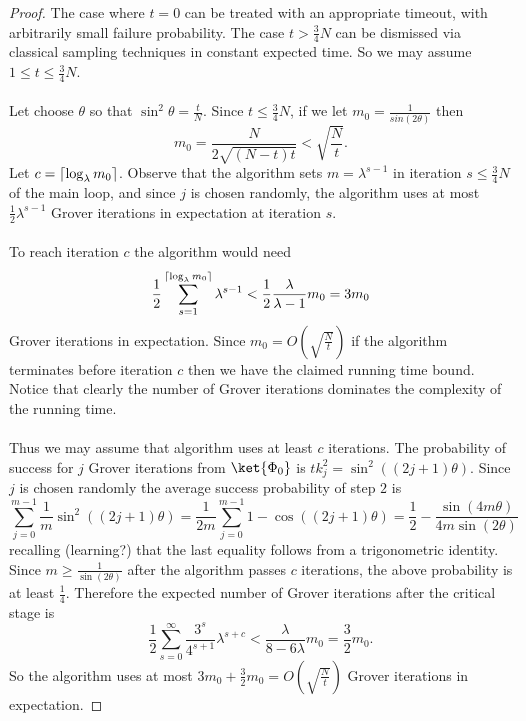 \begin{proof}
The case where $t=0$ can be treated with an appropriate timeout, with arbitrarily small failure probability. The case $t > \frac{3}{4}N$ can be dismissed via classical sampling techniques in constant expected time. So we may assume $1\leq t\leq \frac{3}{4}N$.
\paragraph{}
Let choose $\theta$ so that $\sin^2\theta = \frac{t}{N}$. Since $t\leq \frac{3}{4}N$, if we let $m_0 = \frac{1}{sin(2\theta)}$ then
$$m_0 = \frac{N}{2\sqrt{(N-t)t}} < \sqrt{\frac{N}{t}}.$$
Let $c = \left\lceil\log_\lambda m_0\right\rceil$. Observe that the algorithm sets $m =\lambda^{s-1}$ in iteration $s \leq \frac{3}{4}N$ of the main loop, and since $j$ is chosen randomly, the algorithm uses at most $\frac{1}{2} \lambda^{s-1}$ Grover iterations in expectation at iteration $s$. 
\paragraph{}
To reach iteration $c$ the algorithm would need
$$\frac{1}{2}\sum_{s=1}^{\left\lceil\log_\lambda m_0\right\rceil} \lambda^{s-1} <\frac{1}{2}\frac{\lambda}{\lambda - 1} m_0 = 3m_0$$
Grover iterations in expectation. Since $m_0 = O(\sqrt{\frac{N}{t}})$ if the algorithm terminates before iteration $c$ then we have the claimed running time bound. Notice that clearly the number of Grover iterations dominates the complexity of the running time.
\paragraph{}
Thus we may assume that algorithm uses at least $c$ iterations. The probability of success for $j$ Grover iterations from $\ket{\Phi_0}$ is $tk_j^2= \sin^2((2j+1)\theta)$. Since $j$ is chosen randomly the average success probability of step $2$ is
$$\sum_{j=0}^{m-1}\frac{1}{m}\sin^2((2j+1)\theta) = \frac{1}{2m}\sum_{j=0}^{m-1}1 - \cos((2j+1)\theta) = \frac{1}{2} - \frac{\sin(4m\theta)}{4m\sin(2\theta)}$$
recalling (learning?) that the last equality follows from a trigonometric identity. Since $m \geq \frac{1}{\sin(2\theta)}$ after the algorithm passes $c$ iterations, the above probability is at least $\frac{1}{4}$. Therefore the expected number of Grover iterations after the critical stage is
$$ \frac{1}{2}\sum_{s=0}^\infty \frac{3^s}{4^{s+1}}\lambda^{s+c} < \frac{\lambda}{8-6\lambda}m_0 = \frac{3}{2} m_0. $$
So the algorithm uses at most $3m_0 + \frac{3}{2}m_0 = O(\sqrt{\frac{N}{t}})$ Grover iterations in expectation.
\end{proof}
